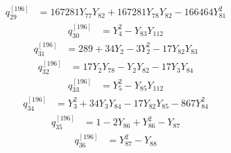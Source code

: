 \begin{equation}\label{q196:row:029}
\begin{aligned}
q_{29}^{[196]} &={} 167281Y_{77}Y_{82} + 167281Y_{78}Y_{82} - 166464Y_{81}^{2}
\end{aligned}
\end{equation}
\begin{equation}\label{q196:row:030}
\begin{aligned}
q_{30}^{[196]} &={} Y_{4}^{2} - Y_{83}Y_{112}
\end{aligned}
\end{equation}
\begin{equation}\label{q196:row:031}
\begin{aligned}
q_{31}^{[196]} &={} 289 + 34Y_{2} - 3Y_{2}^{2} - 17Y_{82}Y_{83}
\end{aligned}
\end{equation}
\begin{equation}\label{q196:row:032}
\begin{aligned}
q_{32}^{[196]} &={} 17Y_{2}Y_{78} - Y_{2}Y_{82} - 17Y_{3}Y_{84}
\end{aligned}
\end{equation}
\begin{equation}\label{q196:row:033}
\begin{aligned}
q_{33}^{[196]} &={} Y_{5}^{2} - Y_{85}Y_{112}
\end{aligned}
\end{equation}
\begin{equation}\label{q196:row:034}
\begin{aligned}
q_{34}^{[196]} &={} Y_{3}^{2} + 34Y_{3}Y_{84} - 17Y_{82}Y_{85} - 867Y_{84}^{2}
\end{aligned}
\end{equation}
\begin{equation}\label{q196:row:035}
\begin{aligned}
q_{35}^{[196]} &={} 1 - 2Y_{86} + Y_{86}^{2} - Y_{87}
\end{aligned}
\end{equation}
\begin{equation}\label{q196:row:036}
\begin{aligned}
q_{36}^{[196]} &={} Y_{87}^{2} - Y_{88}
\end{aligned}
\end{equation}
